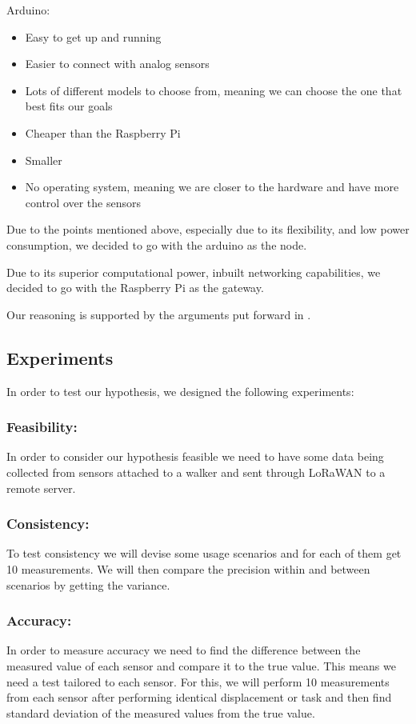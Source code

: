 Arduino:
\begin{itemize}
	\item Easy to get up and running
	\item Easier to connect with analog sensors
	\item Lots of different models to choose from, meaning we can choose the one that best fits our goals
	\item Cheaper than the Raspberry Pi
	\item Smaller 
	\item No operating system, meaning we are closer to the hardware and have more control over the sensors
\end{itemize}



Due to the points mentioned above, especially due to its flexibility, and low power consumption, we decided to go with the arduino as the node.

Due to its superior computational power, inbuilt networking capabilities, we decided to go with the Raspberry Pi as the gateway.

Our reasoning is supported by the arguments put forward in \cite{postolache2011smart}.


\subsection{Experiments}
In order to test our hypothesis, we designed the following experiments:

\subsubsection{Feasibility:}
In order to consider our hypothesis feasible we need to have some data being collected from sensors attached to a walker and sent through LoRaWAN to a remote server.

\subsubsection{Consistency:}
To test consistency we will devise some usage scenarios and for each of them get 10 measurements. We will then compare the precision within and between scenarios by getting the variance.

\subsubsection{Accuracy:}
In order to measure accuracy we need to find the difference between the measured value of each sensor and compare it to the true value. This means we need a test tailored to each sensor. For this, we will perform 10 measurements from each sensor after performing identical displacement or task and then find standard deviation of the measured values from the true value.

